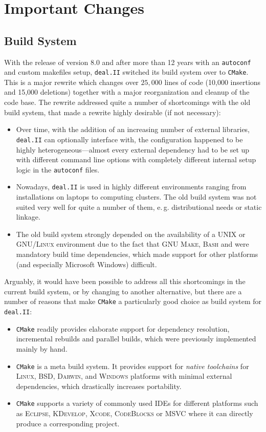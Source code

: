 \documentclass{siamltex}
\newcommand{\specialword}[1]{\texttt{#1}}
\newcommand{\dealii}{{\specialword{deal.II}}}
\newcommand{\cmake}{{\specialword{CMake}}}
\newcommand{\autoconf}{{\specialword{autoconf}}}
\begin{document}
\section{Important Changes}

\subsection{Build System}\label{sec:cmake}

With the release of version 8.0 and after more than 12 years with an
\autoconf{} and custom makefiles setup, \dealii{} switched its build system
over to \cmake{}. This is a major rewrite which changes over $25,000$ lines
of code (10,000 insertions and 15,000 deletions) together with a major
reorganization and cleanup of the code base. The rewrite addressed quite a
number of shortcomings with the old build system, that made a rewrite
highly desirable (if not necessary):
\begin{itemize}
  \item Over time, with the addition of an increasing number of external
    libraries, \dealii{} can optionally interface with, the configuration
    happened to be highly heterogeneous---almost every external dependency
    had to be set up with different command line options with completely
    different internal setup logic in the \autoconf{} files.
  \item Nowadays, \dealii{} is used in highly different environments
    ranging from installations on laptops to computing clusters. The old
    build system was not suited very well for quite a number of them,
    e.\,g. distributional needs or static linkage.
  \item The old build system strongly depended on the availability of a
    \textsc{UNIX} or \textsc{GNU/Linux} environment due to the fact that
    \textsc{GNU Make}, \textsc{Bash} and  were mandatory build
    time dependencies,
    which made support for other platforms (and especially Microsoft
    Windows) difficult.
\end{itemize}
Arguably, it would have been possible to address all this shortcomings in
the current build system, or by changing to another alternative, but there
are a number of reasons that make \cmake{} a particularly good choice as
build system for \dealii{}:
\begin{itemize}
  \item \cmake{} readily provides elaborate support for dependency
    resolution, incremental rebuilds and parallel builds, which were
    previously implemented mainly by hand.
  \item \cmake{} is a meta build system. It provides support for
    \emph{native toolchains} for \textsc{Linux}, \textsc{BSD},
    \textsc{Darwin}, and \textsc{Windows} platforms with minimal external
    dependencies, which drastically increases portability.
  \item \cmake{} supports a variety of commonly used IDEs for different
    platforms such as \textsc{Eclipse}, \textsc{KDevelop}, \textsc{Xcode},
    \textsc{CodeBlocks} or \textsc{MSVC} where it can directly produce a
    corresponding project.
\end{itemize}
\end{document}
